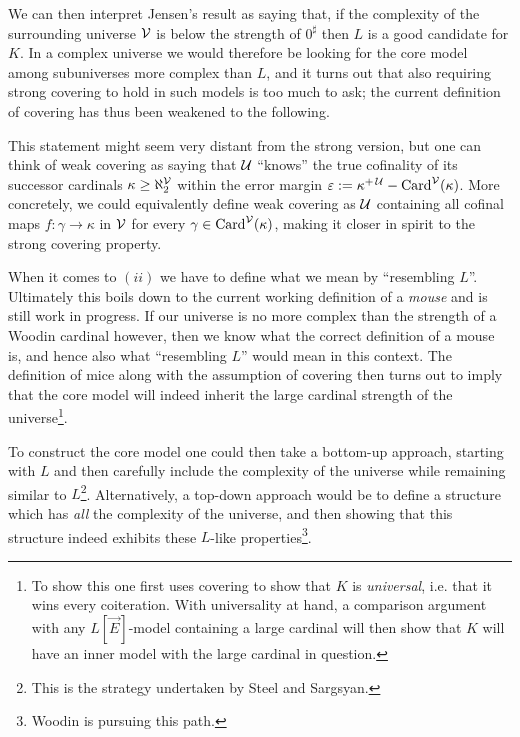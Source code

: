 \documentclass[../../main]{subfiles}
\begin{document}

We can then interpret Jensen's result as saying that, if the complexity of the surrounding universe $\operatorname{\mathcal V}$ is below the strength of $0^\sharp$ then $L$ is a good candidate for $K$. In a complex universe we would therefore be looking for the core model among subuniverses more complex than $L$, and it turns out that also requiring strong covering to hold in such models is too much to ask; the current definition of covering has thus been weakened to the following.


This statement might seem very distant from the strong version, but one can think of weak covering as saying that $\operatorname{\mathcal U}$ ``knows'' the true cofinality of its successor cardinals $\kappa\geq\aleph_2^{\operatorname{\mathcal V}}$ within the error margin $\varepsilon:=\kappa^{+\operatorname{\mathcal U}}-\operatorname{Card}^{\operatorname{\mathcal V}}(\kappa)$. More concretely, we could equivalently define weak covering as $\operatorname{\mathcal U}$ containing all cofinal maps $f\colon\gamma\to\kappa$ in $\operatorname{\mathcal V}$ for every $\gamma\in\operatorname{Card}^{\operatorname{\mathcal V}}(\kappa)$, making it closer in spirit to the strong covering property.


\qquad When it comes to $(ii)$ we have to define what we mean by ``resembling $L$''. Ultimately this boils down to the current working definition of a \textit{mouse} and is still work in progress. If our universe is no more complex than the strength of a Woodin cardinal however, then we know what the correct definition of a mouse is, and hence also what ``resembling $L$'' would mean in this context. The definition of mice along with the assumption of covering then turns out to imply that the core model will indeed inherit the large cardinal strength of the universe\footnote{To show this one first uses covering to show that $K$ is \textit{universal}, i.e. that it wins every coiteration. With universality at hand, a comparison argument with any $L[\vec E]$-model containing a large cardinal will then show that $K$ will have an inner model with the large cardinal in question.}.

\qquad To construct the core model one could then take a bottom-up approach, starting with $L$ and then carefully include the complexity of the universe while remaining similar to $L$\footnote{This is the strategy undertaken by Steel and Sargsyan.}. Alternatively, a top-down approach would be to define a structure which has \textit{all} the complexity of the universe, and then showing that this structure indeed exhibits these $L$-like properties\footnote{Woodin is pursuing this path.}.
\end{document}
